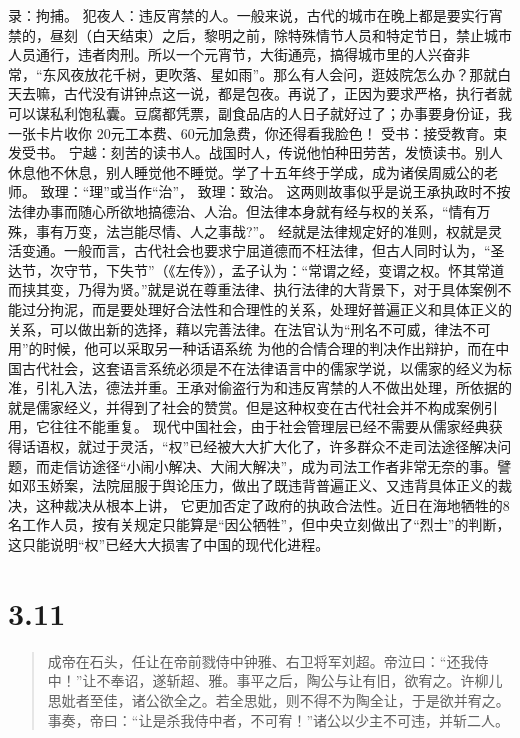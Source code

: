 \documentclass[]{book}
\begin{document}
录：拘捕。
犯夜人：违反宵禁的人。一般来说，古代的城市在晚上都是要实行宵禁的，昼刻（白天结束）之后，黎明之前，除特殊情节人员和特定节日，禁止城市人员通行，违者肉刑。所以一个元宵节，大街通亮，搞得城市里的人兴奋非常，``东风夜放花千树，更吹落、星如雨''。那么有人会问，逛妓院怎么办？那就白天去嘛，古代没有讲钟点这一说，都是包夜。再说了，正因为要求严格，执行者就可以谋私利饱私囊。豆腐都凭票，副食品店的人日子就好过了；办事要身份证，我一张卡片收你
20元工本费、60元加急费，你还得看我脸色！ 受书：接受教育。束发受书。
宁越：刻苦的读书人。战国时人，传说他怕种田劳苦，发愤读书。别人休息他不休息，别人睡觉他不睡觉。学了十五年终于学成，成为诸侯周威公的老师。
致理：``理''或当作``治''， 致理：致治。
这两则故事似乎是说王承执政时不按法律办事而随心所欲地搞德治、人治。但法律本身就有经与权的关系，``情有万殊，事有万变，法岂能尽情、人之事哉?''。
经就是法律规定好的准则，权就是灵活变通。一般而言，古代社会也要求宁屈道德而不枉法律，但古人同时认为，``圣达节，次守节，下失节''（《左传》），孟子认为：``常谓之经，变谓之权。怀其常道而挟其变，乃得为贤。''就是说在尊重法律、执行法律的大背景下，对于具体案例不能过分拘泥，而是要处理好合法性和合理性的关系，处理好普遍正义和具体正义的关系，可以做出新的选择，藉以完善法律。在法官认为``刑名不可威，律法不可用''的时候，他可以采取另一种话语系统
为他的合情合理的判决作出辩护，而在中国古代社会，这套语言系统必须是不在法律语言中的儒家学说，以儒家的经义为标准，引礼入法，德法并重。王承对偷盗行为和违反宵禁的人不做出处理，所依据的就是儒家经义，并得到了社会的赞赏。但是这种权变在古代社会并不构成案例引用，它往往不能重复。
现代中国社会，由于社会管理层已经不需要从儒家经典获得话语权，就过于灵活，``权''已经被大大扩大化了，许多群众不走司法途径解决问题，而走信访途径``小闹小解决、大闹大解决''，成为司法工作者非常无奈的事。譬如邓玉娇案，法院屈服于舆论压力，做出了既违背普遍正义、又违背具体正义的裁决，这种裁决从根本上讲，
它更加否定了政府的执政合法性。近日在海地牺牲的8名工作人员，按有关规定只能算是``因公牺牲''，但中央立刻做出了``烈士''的判断，这只能说明``权''已经大大损害了中国的现代化进程。

\section{3.11}\label{section-165}

\begin{quote}
成帝在石头，任让在帝前戮侍中钟雅、右卫将军刘超。帝泣曰：``还我侍中！''让不奉诏，遂斩超、雅。事平之后，陶公与让有旧，欲宥之。许柳儿思妣者至佳，诸公欲全之。若全思妣，则不得不为陶全让，于是欲并宥之。事奏，帝曰：``让是杀我侍中者，不可宥！''诸公以少主不可违，并斩二人。
\end{quote}
\end{document}
